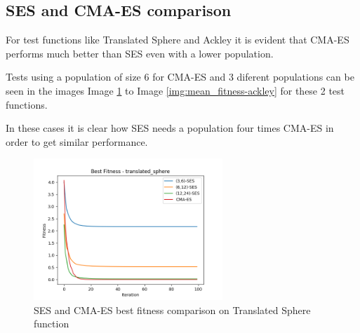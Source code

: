 



\subsection{SES and CMA-ES comparison}

For test functions like Translated Sphere and Ackley it is evident that CMA-ES performs much better than SES even with a lower population.

Tests using a population of size 6 for CMA-ES and 3 diferent populations can be seen in the images Image \ref{img:best_fitness-translated_sphere} to Image \ref{img:mean_fitness-ackley} for these 2 test functions.

In these cases it is clear how SES needs a population four times CMA-ES in order to get similar performance.

\begin{figure}
  \begin{center}
  \includegraphics[width=2.8in]{./../code/benchmark_results/best_fitness-translated_sphere.png}
  \caption{SES and CMA-ES best fitness comparison on Translated Sphere function}
  \label{img:best_fitness-translated_sphere}
  \end{center}
\end{figure}

